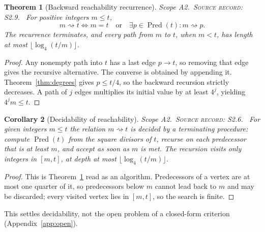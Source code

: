 \documentclass[11pt,oneside,openany]{book}
\newtheorem{theorem}{Theorem}[chapter]
\newtheorem{corollary}[theorem]{Corollary}
\theoremstyle{definition}
\theoremstyle{remark}
\newcommand{\Pred}{\operatorname{Pred}}
\newcommand{\scope}[1]{\textsf{\small Scope #1.}\ }
\newcommand{\record}[1]{\textup{\textsc{Source record: #1.}}\ }
\begin{document}
\begin{theorem}[Backward reachability recurrence]\label{thm:reach-rec}
\scope{A2}\record{S2.9} For positive integers \(m\le t\),
\begin{equation}\label{eq:reachrec}
 m\rightsquigarrow t\iff m=t\quad\text{or}\quad
 \exists p\in\Pred(t):m\rightsquigarrow p.
\end{equation}
The recurrence terminates, and every path from \(m\) to \(t\), when \(m<t\), has length at most \(\lfloor\log_4(t/m)\rfloor\).
\end{theorem}
\begin{proof}
Any nonempty path into \(t\) has a last edge \(p\to t\), so removing that edge gives the recursive alternative. The converse is obtained by appending it. Theorem~\ref{thm:degrees} gives \(p\le t/4\), so the backward recursion strictly decreases. A path of \(j\) edges multiplies its initial value by at least \(4^j\), yielding \(4^j m\le t\).
\end{proof}
\begin{corollary}[Decidability of reachability]\label{cor:decide}
\scope{A2}\record{S2.6} For given integers \(m\le t\) the relation \(m\rightsquigarrow t\) is decided by a terminating procedure: compute \(\Pred(t)\) from the square divisors of \(t\), recurse on each predecessor that is at least \(m\), and accept as soon as \(m\) is met. The recursion visits only integers in \([m,t]\), at depth at most \(\lfloor\log_4(t/m)\rfloor\).
\end{corollary}
\begin{proof}
This is Theorem~\ref{thm:reach-rec} read as an algorithm. Predecessors of a vertex are at most one quarter of it, so predecessors below \(m\) cannot lead back to \(m\) and may be discarded; every visited vertex lies in \([m,t]\), so the search is finite.
\end{proof}
This settles decidability, not the open problem of a closed-form criterion (Appendix~\ref{app:open}).
\end{document}
